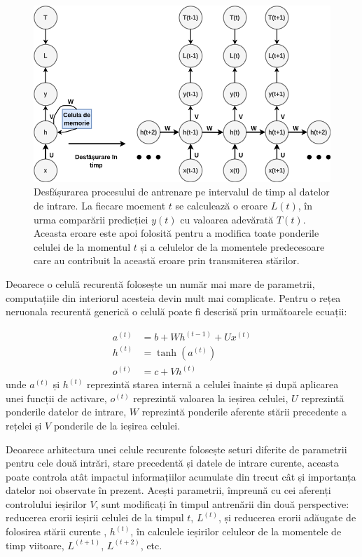 \documentclass[a4paper,12pt]{book}
\begin{document}
				\begin{figure}[t]
					\centering
					\includegraphics[scale=0.6]{rnn_layer}
					\caption{Desfășurarea procesului de antrenare pe intervalul de timp al datelor de intrare. La fiecare moement $t$ se calculează o eroare $L(t)$, în urma comparării predicției $y(t)$ cu valoarea adevărată $T(t)$. Aceasta eroare este apoi folosită pentru a modifica toate ponderile celulei de la momentul $t$ și a celulelor de la momentele predecesoare care au contribuit la această eroare prin transmiterea stărilor.
					}
					\label{fig:rnn_layer}
				\end{figure} 
					Deoarece o celulă recurentă folosește un număr mai mare de parametrii, computațiile din interiorul acesteia devin mult mai complicate. Pentru o rețea neruonala recurentă generică o celulă poate fi descrisă prin următoarele ecuații:
				
				\begin{align}
					a^{(t)} &= b + Wh^{(t-1)} + Ux^{(t)} \\ \label{rnn_states}
					h^{(t)} &= \tanh{(a^{(t)})}\\
					o^{(t)} &= c + Vh^{(t)}	
				\end{align}
				unde $a^{(t)}$ și $h^{(t)}$ reprezintă starea internă a celulei înainte și după aplicarea unei funcții de activare, $o^{(t)}$ reprezintă valoarea la ieșirea celulei, $U$ reprezintă ponderile datelor de intrare, $W$ reprezintă ponderile aferente stării precedente a rețelei și $V$ ponderile de la ieșirea celulei. \par
				
				Deoarece arhitectura unei celule recurente folosește seturi diferite de parametrii pentru cele două intrări, stare precedentă și datele de intrare curente, aceasta poate controla atât impactul informațiilor acumulate din trecut cât și importanța datelor noi observate în prezent. Acești parametrii, împreună cu cei aferenți controlului ieșirilor $V$,  sunt modificați în timpul antrenării din două perspective: reducerea erorii ieșirii celulei de la timpul $t$, $L^{(t)}$,  și reducerea erorii adăugate de folosirea stării curente , $h^{(t)}$, în calculele ieșirilor celuleor de la momentele de timp viitoare, $L^{(t+1)}$, $L^{(t+2)}$, etc. \par
				
\end{document}
